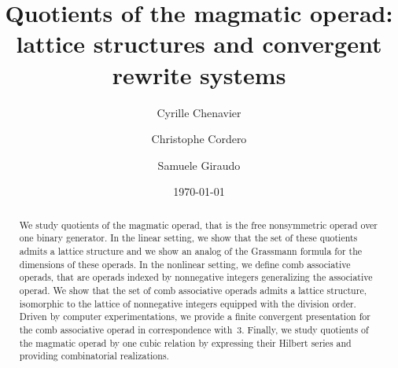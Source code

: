 \documentclass[10pt,reqno]{amsart}
\title[Quotients of the magmatic operad]
      {Quotients of the magmatic operad:\\
        lattice structures and convergent rewrite systems}
\date{\today}
\author{Cyrille Chenavier \and Christophe Cordero \and Samuele Giraudo}
\numberwithin{equation}{subsection}
\begin{document}
\begin{abstract}
    We study quotients of the magmatic operad, that is the free
    nonsymmetric operad over one binary generator. In the linear
    setting, we show that the set of these quotients admits a lattice
    structure and we show an analog of the Grassmann formula for the
    dimensions of these operads. In the nonlinear setting, we define
    comb associative operads, that are operads indexed by nonnegative
    integers generalizing the associative operad. We show that the set
    of comb associative operads admits a lattice structure, isomorphic
    to the lattice of nonnegative integers equipped with the division
    order. Driven by computer experimentations, we provide a finite
    convergent presentation for the comb associative operad in
    correspondence with~$3$. Finally, we study quotients of the magmatic
    operad by one cubic relation by expressing their Hilbert series and
    providing combinatorial realizations.
\end{abstract}

\maketitle

\begin{small}
\tableofcontents
\end{small}








\end{document}
